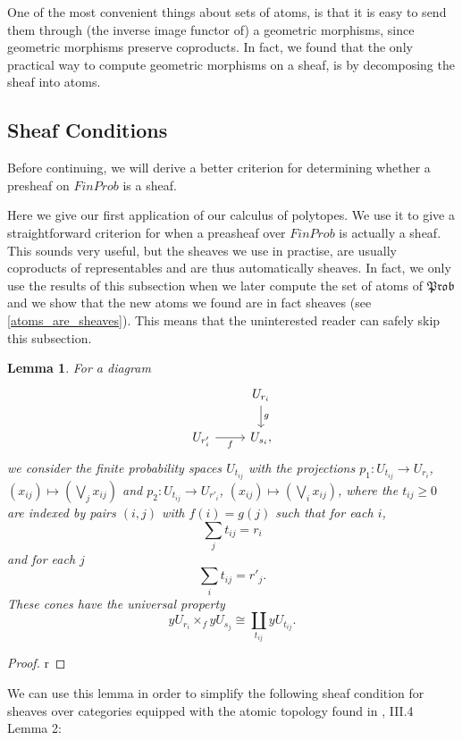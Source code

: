 \documentclass[a4paper]{amsproc}
\theoremstyle{plain}
\newtheorem{lemma}[theorem]{Lemma}
\theoremstyle{definition}
\theoremstyle{remark}
\numberwithin{equation}{section}
\begin{document}
One of the most convenient things about sets of atoms, is that it is easy to send them through (the inverse image functor of) a geometric morphisms, since geometric morphisms preserve coproducts. In fact, we found that the only practical way to compute geometric morphisms on a sheaf, is by decomposing the sheaf into atoms. %

\subsection{Sheaf Conditions}

Before continuing, we will derive a better criterion for determining whether a presheaf on $FinProb$ is a sheaf.

Here we give our first application of our calculus of polytopes. We use it to give a straightforward criterion for when a preasheaf over $FinProb$ is actually a sheaf. This sounds very useful, but the sheaves we use in practise, are usually coproducts of representables and are thus automatically sheaves. In fact, we only use the results of this subsection when we later compute the set of atoms of $\mathfrak{Prob}$ and we show that the new atoms we found are in fact sheaves (see \ref{atoms_are_sheaves}). This means that the uninterested reader can safely skip this subsection.

\begin{lemma} \label{multipullback}
    For a diagram
    \[
    \begin{tikzcd}
    & U_{r_i} \arrow[d, "g"] \\
    U_{r'_i} \arrow[r, "f"'] & U_{s_i} ,
    \end{tikzcd}
    \]
    we consider the finite probability spaces $U_{t_{ij}}$ with the projections $p_1: U_{t_{ij}} \to U_{r_i}$, $(x_{ij}) \mapsto (\bigvee_j x_{ij})$ and $p_2: U_{t_{ij}} \to U_{r'_i}$, $(x_{ij}) \mapsto (\bigvee_i x_{ij})$, where the $t_{ij} \geq 0$ are indexed by pairs $(i, j)$ with $f(i) = g(j)$ such that for each $i$,
    \[
    \sum_j t_{ij} = r_i
    \]
    and for each $j$
    \[
    \sum_i t_{ij} = r'_j .
    \]
    These cones have the universal property
    \[
    y U_{r_i} \times_f y U_{s_j} \cong \coprod_{t_{ij}} y U_{t_{ij}} .
    \]
\end{lemma}
\begin{proof}
r
\end{proof}

We can use this lemma in order to simplify the following sheaf condition for sheaves over categories equipped with the atomic topology found in \cite{sheaves_geometry_logic}, III.4 Lemma 2:
\end{document}
